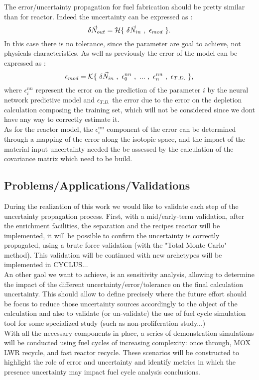 \documentclass[dvips,12pt]{article}
\begin{document}
The error/uncertainty propagation for fuel fabrication should be pretty similar than for reactor. Indeed the uncertainty can be expressed as :
\begin{equation}
\delta \vec{N}_{out} = {\cal H}\{~\delta\vec{N}_{in}~,~\epsilon_{mod}~\}.
\end{equation}
In this case there is no tolerance, since the parameter are goal to achieve, not physicals characteristics. As well as previously the error of the model can be expressed as :
\begin{equation}
\epsilon_{mod} = {\cal K}\{~\delta\vec{N}_{in}~,~\epsilon^{nn}_{0}~,~...~,~\epsilon^{nn}_{n}~,~\epsilon_{T.D.}~\},
\end{equation}
 where $\epsilon^{nn}_{i}$ represent the error on the prediction of the parameter $i$ by the neural network predictive model and $\epsilon_{T.D.}$ the error due to the error on the depletion calculation composing the training set, which will not be considered since we dont have any way to correctly estimate it.\\
 
 As for the reactor model, the $\epsilon^{nn}_{i}$ component of the error can be determined through a mapping of the error along the isotopic space, and the impact of the material input uncertainty needed the be assessed by the calculation of the covariance matrix which need to be build.

\subsection{Problems/Applications/Validations}
During the realization of this work we would like to validate each step of the uncertainty propagation process. First, with a mid/early-term validation, after the enrichment facilities, the separation and the recipes reactor will be implemented, it will be possible to confirm the uncertainty is correctly propagated, using a brute force validation (with the "Total Monte Carlo" method). This validation will be continued with new archetypes will be implemented in CYCLUS...\\
An other gaol we want to achieve, is an sensitivity analysis, allowing to determine the impact of the different uncertainty/error/tolerance on the final calculation uncertainty. This should allow to define precisely where the future effort should be focus to reduce those uncertainty sources accordingly to the object of the calculation and also to validate (or un-validate) the use of fuel cycle simulation tool for some specialized study (such as non-proliferation study...)\\
With all the necessary components in place, a series of demonstration simulations will be conducted using fuel cycles of increasing complexity: once through, MOX LWR recycle, and fast reactor recycle.  These scenarios will be constructed to highlight the role of error and uncertainty and identify metrics in which the presence uncertainty may impact fuel cycle analysis conclusions.
\end{document}
